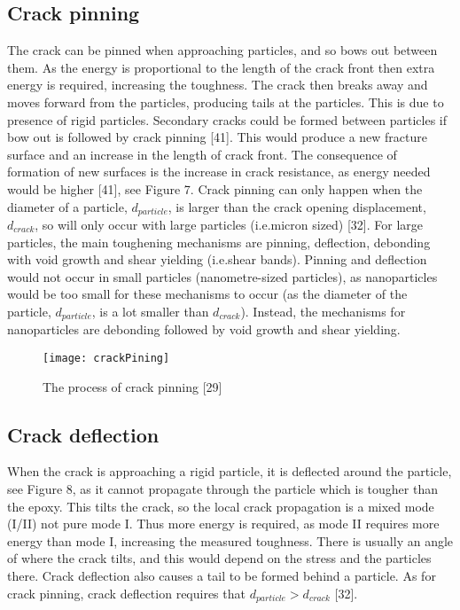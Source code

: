 \documentclass[numbers=noendperiod,chapterprefix=on]{icldt} %
\begin{document}
\subsection{Crack pinning}
The crack can be pinned when approaching particles, and so bows out between them. As the energy is proportional to the length of the crack front then extra energy is required, increasing the toughness. The crack then breaks away and moves forward from the particles, producing tails at the particles. This is due to presence of rigid particles. Secondary cracks could be formed between particles if bow out is followed by crack pinning [41]. This would produce a new fracture surface and an increase in the length of crack front. The consequence of formation of new surfaces is the increase in crack resistance, as energy needed would be higher [41], see Figure 7. 
Crack pinning can only happen when the diameter of a particle, $d_{particle}$, is larger than the crack opening displacement, $d_{crack}$, so will only occur with large particles (i.e.micron sized) [32]. For large particles, the main toughening mechanisms are pinning, deflection, debonding with void growth and shear yielding (i.e.shear bands). Pinning and deflection would not occur in small particles (nanometre-sized particles), as nanoparticles would be too small for these mechanisms to occur (as the diameter of the particle, $d_{particle}$, is a lot smaller than $d_{crack}$). Instead, the mechanisms for nanoparticles are debonding followed by void growth and shear yielding.

\begin{figure}[!htpb]
\centering
\texttt{[image: crackPining]}
\caption{The process of crack pinning [29]} %
\end{figure}

\subsection{Crack deflection}
When the crack is approaching a rigid particle, it is deflected around the particle, see Figure 8, as it cannot propagate through the particle which is tougher than the epoxy. This tilts the crack, so the local crack propagation is a mixed mode (I/II) not pure mode I. Thus more energy is required, as mode II requires more energy than mode I, increasing the measured toughness. There is usually an angle of where the crack tilts, and this would depend on the stress and the particles there. Crack deflection also causes a tail to be formed behind a particle. As for crack pinning, crack deflection requires that $d_{particle} > d_{crack}$ [32]. 
\end{document}
